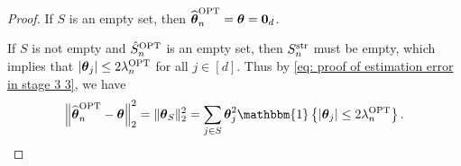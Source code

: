 \documentclass[aos,preprint]{imsart}
\theoremstyle{plain}
\theoremstyle{definition}
\newcommand{\btheta}{\boldsymbol{\theta}}
\newcommand{\idf}{\mathbbm{1}}
\newcommand{\ptheta}{\widehat{\boldsymbol{\theta}}^{\textup{OPT}}}
\newcommand{\hdlambda}{\lambda^{\textup{OPT}}}
\newcommand{\pS}{\hat{S}^{\textup{OPT}}}
\newcommand{\hdS}{\hat{S}^{\textup{OPT}}}
\begin{document}
\begin{appendix}
\begin{proof}
If $S$ is an empty set, then $\ptheta_n = \btheta = \boldsymbol{0}_d$.  

If $S$ is not empty and $\hdS_n$ is an empty set, then $S_n^{\textup{str}}$ must be empty, which implies that $|\btheta_j| \leq 2 \hdlambda_n$ for all $j \in [d]$. Thus by \eqref{eq: proof of estimation error in stage 3 3}, we have
\begin{equation*}
    \left\|\ptheta_n-\btheta \right\|_2^2  = \|\btheta_{S}\|_2^2 = \sum_{j\in S} \btheta_j^2 \idf\left\{\left|\btheta_j\right| \le 2\hdlambda_n \right\}.
\end{equation*}


\end{proof}
\end{appendix}
\end{document}
